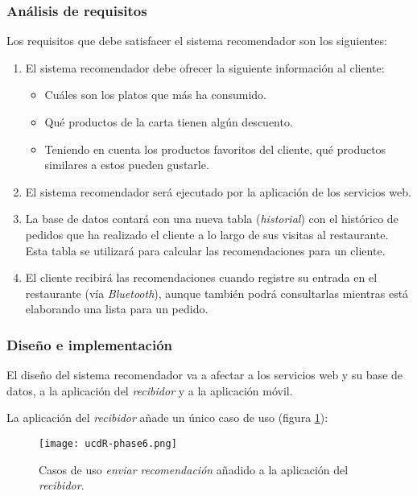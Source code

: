 \subsubsection{Análisis de requisitos}
Los requisitos que debe satisfacer el sistema recomendador son los siguientes:
\begin{enumerate}
\item El sistema recomendador debe ofrecer la siguiente información al cliente:
  \begin{itemize}
  \item Cuáles son los platos que más ha consumido.
  \item Qué productos de la carta tienen algún descuento.
  \item Teniendo en cuenta los productos favoritos del cliente, qué productos
  similares a estos pueden gustarle.
  \end{itemize}
\item El sistema recomendador será ejecutado por la aplicación de los
servicios web.
\item La base de datos contará con una nueva tabla (\emph{historial}) con el
histórico de pedidos que ha realizado el cliente a lo largo de sus visitas
al restaurante. Esta tabla se utilizará para calcular las recomendaciones para
un cliente.
\item El cliente recibirá las recomendaciones cuando registre su entrada en el
restaurante (vía \emph{Bluetooth}), aunque también podrá consultarlas mientras
está elaborando una lista para un pedido.
\end{enumerate}

\subsubsection{Diseño e implementación}
El diseño del sistema recomendador va a afectar a los servicios web y su
base de datos, a la aplicación del \emph{recibidor} y a la aplicación
móvil.

La aplicación del \emph{recibidor} añade un único caso de uso (figura
\ref{fig:ucdR-phase6}):

  \begin{figure}[H]
    \begin{center}
      \texttt{[image: ucdR-phase6.png]}
      \caption{Casos de uso \emph{enviar recomendación} añadido a la aplicación 
      del \emph{recibidor}.}
      \label{fig:ucdR-phase6}
    \end{center}
  \end{figure}


